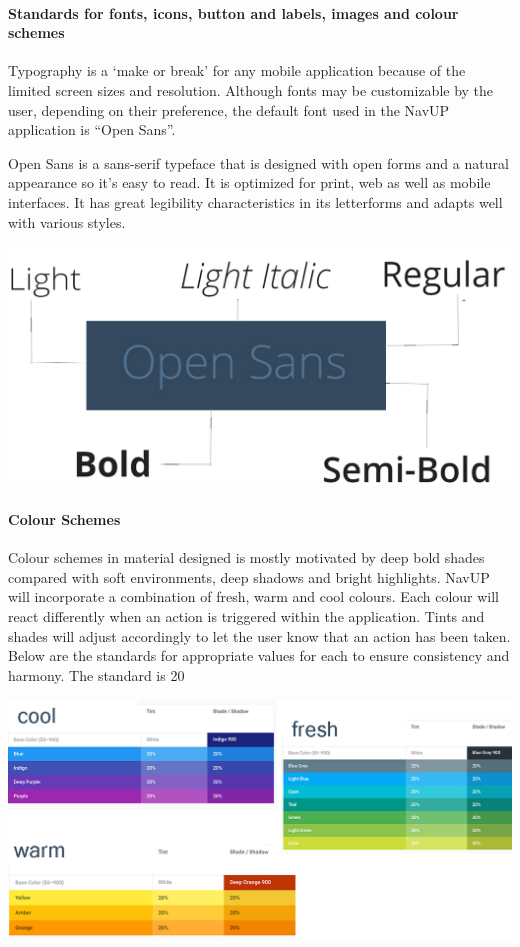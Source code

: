 \documentclass[11pt]{article}
\begin{document}
	\paragraph{Standards for fonts, icons, button and labels, images and colour schemes } 
	
	Typography is a ‘make or break’ for any mobile application because of the limited screen sizes and resolution. Although fonts may be customizable by the user, depending on their preference, the default font used in the NavUP application is “Open Sans”.
	
	 Open Sans is a sans-serif typeface that is designed with open forms and a natural appearance so it’s easy to read. It is optimized for print, web as well as mobile interfaces. It has great legibility characteristics in its letterforms and adapts well with various styles. 
	
	\includegraphics[width=0.5\linewidth]{Images/openSans.jpg}\\[1cm]
	
	\paragraph{Colour Schemes}
	
	Colour schemes in material designed is mostly motivated by deep bold shades compared with soft environments, deep shadows and bright highlights. NavUP will incorporate a combination of fresh, warm and cool colours. Each colour will react differently when an action is triggered within the application. Tints and shades will adjust accordingly to let the user know that an action has been taken. Below are the standards for appropriate values for each to ensure consistency and harmony. The standard is 20%
	
	\includegraphics[width=0.5\linewidth]{Images/colourScheme.jpg}\\[1cm]	
	
\end{document}
